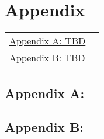 \chapter{Appendix}

\begin{tabular}{p{14.9cm}r}
\hyperref[app:A]{Appendix A: TBD} & \pageref{app:A} \\
\hyperref[app:B]{Appendix B: TBD} & \pageref{app:B} \\
\end{tabular}
\pagebreak

\section*{Appendix A:}
\label{app:A} 

\section*{Appendix B:}
\label{app:B}
